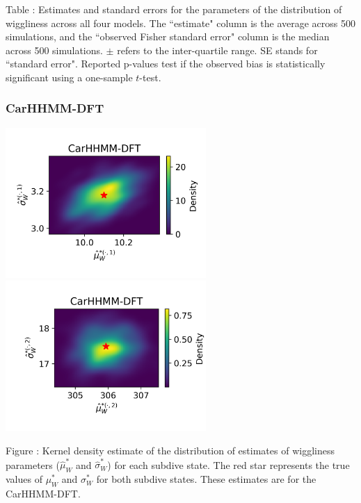 \documentclass{article}
\begin{document}
        \noindent Table : Estimates and standard errors for the parameters of the distribution of wiggliness across all four models. The ``estimate" column is the average across 500 simulations, and the ``observed Fisher standard error" column is the median across 500 simulations. $\pm$ refers to the inter-quartile range. SE stands for ``standard error". Reported p-values test if the observed bias is statistically significant using a one-sample $t$-test.
        \addtocounter{tablenum}{1}
    
        \subsubsection{CarHHMM-DFT}
        \begin{center}
        \includegraphics[width=3in]{../Plots/hhmm_FV_MLE_density_FoVeDBA_0_0.png}
        \includegraphics[width=3in]{../Plots/hhmm_FV_MLE_density_FoVeDBA_0_1.png}
        \end{center}
        
        \noindent Figure : Kernel density estimate of the distribution of estimates of wiggliness parameters ($\hat \mu^*_W$ and $\hat \sigma^*_W$) for each subdive state. The red star represents the true values of $\mu^*_W$ and $\sigma^*_W$ for both subdive states. These estimates are for the CarHHMM-DFT.
        \addtocounter{fignum}{1}
        
\end{document}
